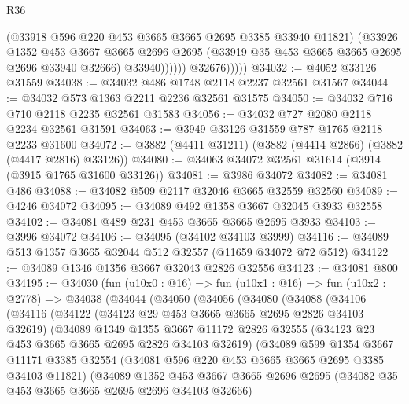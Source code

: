 \begin{lexlean}{R36}
\begin{coremodule}
                        (@33918 @596 @220 @453 @3665 @3665 @2695 @3385 @33940 @11821)
                        (@33926
                          @1352
                          @453
                          @3667
                          @3665
                          @2696
                          @2695
                          (@33919 @35 @453 @3665 @3665 @2695 @2696 @33940 @32666)
                          @33940))))))
              @32676)))))
@34032 := @4052 @33126 @31559
@34038 := @34032 @486 @1748 @2118 @2237 @32561 @31567
@34044 := @34032 @573 @1363 @2211 @2236 @32561 @31575
@34050 := @34032 @716 @710 @2118 @2235 @32561 @31583
@34056 := @34032 @727 @2080 @2118 @2234 @32561 @31591
@34063 := @3949 @33126 @31559 @787 @1765 @2118 @2233 @31600
@34072 := @3882 (@4411 @31211) (@3882 (@4414 @2866) (@3882 (@4417 @2816) @33126))
@34080 := @34063 @34072 @32561 @31614 (@3914 (@3915 @1765 @31600 @33126))
@34081 := @3986 @34072
@34082 := @34081 @486
@34088 := @34082 @509 @2117 @32046 @3665 @32559 @32560
@34089 := @4246 @34072
@34095 := @34089 @492 @1358 @3667 @32045 @3933 @32558
@34102 := @34081 @489 @231 @453 @3665 @3665 @2695 @3933
@34103 := @3996 @34072
@34106 := @34095 (@34102 @34103 @3999)
@34116 := @34089 @513 @1357 @3665 @32044 @512 @32557 (@11659 @34072 @72 @512)
@34122 := @34089 @1346 @1356 @3667 @32043 @2826 @32556
@34123 := @34081 @800
@34195 := @34030
    (fun (u10x0 : @16) =>
    fun (u10x1 : @16) =>
    fun (u10x2 : @2778) =>
    @34038
      (@34044
        (@34050
          (@34056
            (@34080
              (@34088
                (@34106
                  (@34116
                    (@34122
                      (@34123 @29 @453 @3665 @3665 @2695 @2826 @34103 @32619)
                      (@34089
                        @1349
                        @1355
                        @3667
                        @11172
                        @2826
                        @32555
                        (@34123 @23 @453 @3665 @3665 @2695 @2826 @34103 @32619)
                        (@34089
                          @599
                          @1354
                          @3667
                          @11171
                          @3385
                          @32554
                          (@34081 @596 @220 @453 @3665 @3665 @2695 @3385 @34103 @11821)
                          (@34089
                            @1352
                            @453
                            @3667
                            @3665
                            @2696
                            @2695
                            (@34082 @35 @453 @3665 @3665 @2695 @2696 @34103 @32666)

\end{coremodule}
\end{lexlean}
